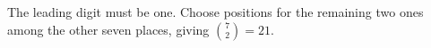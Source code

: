 The leading digit must be one. Choose positions for the remaining two ones among the other seven places, giving $\binom72=\boxed{21}$.
